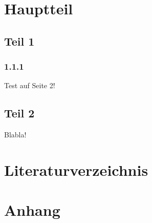 \documentclass[a4paper,12pt]{scrartcl}
\begin{document}
\section{Hauptteil}
\subsection{Teil 1}
\subsubsection{1.1.1}

Test auf Seite 2!
\newpage
\subsection{Teil 2}

Blabla!
\newpage

\section{Literaturverzeichnis}
\newpage

\section{Anhang}
\end{document}

